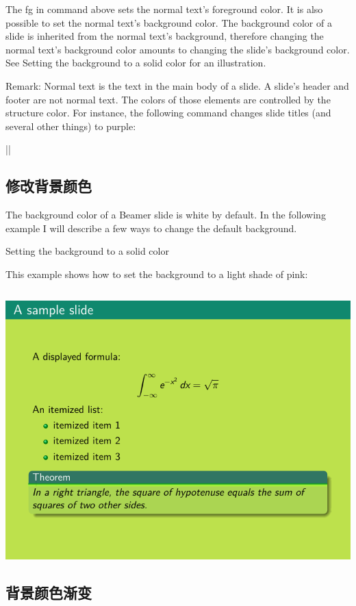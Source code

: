\begin{column}{0.5\textwidth}
The fg in command above sets the normal text’s foreground color. It is also possible to set the normal text’s background color. The background color of a slide is inherited from the normal text’s background, therefore changing the normal text’s background color amounts to changing the slide’s background color. See  Setting the background to a solid color for an illustration.

Remark: Normal text is the text in the main body of a slide. A slide’s header and footer are not normal text. The colors of those elements are controlled by the structure color. For instance, the following command changes slide titles (and several other things) to purple:

|| 

\subsection{修改背景颜色}

The background color of a Beamer slide is white by default. In the following example I will describe a few ways to change the default background.


Setting the background to a solid color

This example shows how to set the background to a light shade of pink:

\inputminted[linenos=true]{latex}{examples/beamer/theme-background-color.tex}

\includegraphics{examples/beamer/theme-background-color.pdf}

\subsection{背景颜色渐变}


\end{column}
